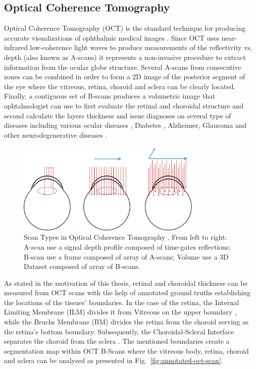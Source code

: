 \documentclass[12pt,a4paper]{scrartcl}
\begin{document}
\subsection{Optical Coherence Tomography}
Optical Coherence Tomography (OCT) is the standard technique for producing accurate visualizations of ophthalmic medical images \cite{Garrido2014}. Since OCT uses near-infrared low-coherence light waves to produce measurements of the reflectivity vs. depth (also known as A-scans\cite{Garrido2014}) it represents a non-invasive procedure to extract information from the ocular globe structure. Several A-scans from consecutive zones can be combined in order to form a 2D image of the posterior segment of the eye where the vitreous, retina, choroid and sclera can be clearly located. Finally, a contiguous set of B-scans produces a volumetric image that ophtalmologist can use to first evaluate the retinal and choroidal structure and second calculate the layers thickness and issue diagnoses on several type of diseases including various ocular diseases \cite{Ronchetti2019}, Diabetes \cite{Jiang2018}, Alzheimer, Glaucoma and other neurodegenerative diseases \cite{DENHAAN2017162}.   


\begin{figure}[H]
    \centering
    \includegraphics[width=0.8\textwidth]{./images/csm_ABC_scans.png}
    \caption{Scan Types in Optical Coherence Tomography \cite{Willdeman2016}. From left to right: A-scan use a signal depth profile composed of time-gates reflections; B-scan use a frame composed of array of A-scans; Volume use a 3D Dataset composed of array of B-scans.}
    \label{fig:mb-oct-abcscans}
\end{figure}

As stated in the motivation of this thesis, retinal and choroidal thickness can be measured from OCT scans with the help of annotated ground truths establishing the locations of the tissues' boundaries. In the case of the retina, the Internal Limiting Membrane (ILM) divides it from Vitreous on the upper boundary \cite{MACNAIR2015343}, while the Bruchs Membrane (BM) divides the retina from the choroid \cite{BOOIJ20101} serving as the retina's bottom boundary. Subsequently, the Choroidal-Scleral Interface separates the choroid from the sclera \cite{Ronchetti2018}. The mentioned boundaries create a segmentation map within OCT B-Scans where the vitreous body, retina, choroid and sclera can be analysed as presented in Fig.~\ref{fig:annotated-oct-scan}. 
\end{document}
